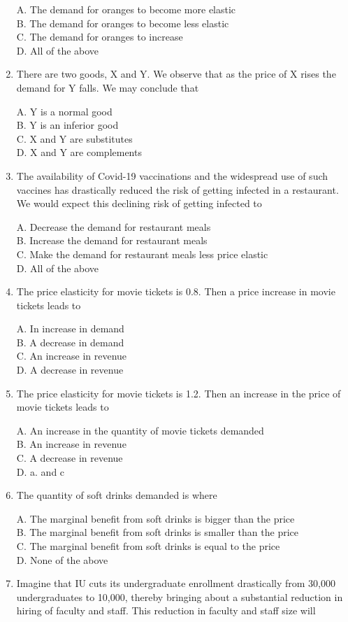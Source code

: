 \documentclass[
]{book}
\begin{document}
\begin{enumerate}
  A. The demand for oranges to become more elastic\\
  B. The demand for oranges to become less elastic\\
  C. The demand for oranges to increase\\
  D. All of the above
\item
  There are two goods, X and Y. We observe that as the price of X rises the demand for Y falls. We may conclude that

  A. Y is a normal good\\
  B. Y is an inferior good\\
  C. X and Y are substitutes\\
  D. X and Y are complements
\item
  The availability of Covid-19 vaccinations and the widespread use of such vaccines has drastically reduced the risk of getting infected in a restaurant. We would expect this declining risk of getting infected to

  A. Decrease the demand for restaurant meals\\
  B. Increase the demand for restaurant meals\\
  C. Make the demand for restaurant meals less price elastic\\
  D. All of the above
\item
  The price elasticity for movie tickets is 0.8. Then a price increase in movie tickets leads to

  A. In increase in demand\\
  B. A decrease in demand\\
  C. An increase in revenue\\
  D. A decrease in revenue
\item
  The price elasticity for movie tickets is 1.2. Then an increase in the price of movie tickets leads to

  A. An increase in the quantity of movie tickets demanded\\
  B. An increase in revenue\\
  C. A decrease in revenue\\
  D. a. and c
\item
  The quantity of soft drinks demanded is where

  A. The marginal benefit from soft drinks is bigger than the price\\
  B. The marginal benefit from soft drinks is smaller than the price\\
  C. The marginal benefit from soft drinks is equal to the price\\
  D. None of the above
\item
  Imagine that IU cuts its undergraduate enrollment drastically from 30,000 undergraduates to 10,000, thereby bringing about a substantial reduction in hiring of faculty and staff. This reduction in faculty and staff size will


\end{enumerate}
\end{document}
